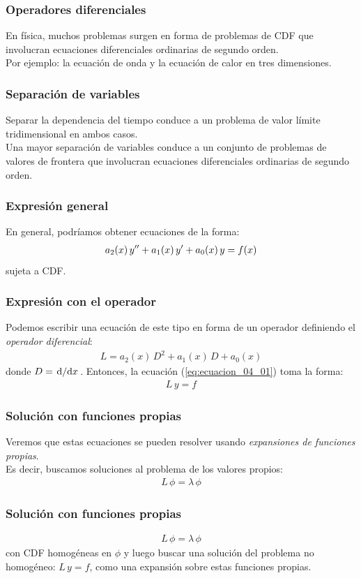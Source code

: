 \documentclass[12pt]{beamer}
\begin{document}
\begin{frame}
\frametitle{Operadores diferenciales}
En física, muchos problemas surgen en forma de problemas de CDF que involucran ecuaciones diferenciales ordinarias de segundo orden.
\\
\bigskip
\pause
Por ejemplo: la ecuación de onda y la ecuación de calor en tres dimensiones.
\end{frame}
\begin{frame}
\frametitle{Separación de variables}
Separar la dependencia del tiempo conduce a un problema de valor límite tridimensional en ambos casos.
\\
\bigskip
\pause
Una mayor separación de variables conduce a un conjunto de problemas de valores de frontera que involucran ecuaciones diferenciales ordinarias de segundo orden.
\end{frame}
\begin{frame}
\frametitle{Expresión general}
En general, podríamos obtener ecuaciones de la forma:
\pause
\begin{align}
a_{2} (x) \, {y}^{\prime \prime} + a_{1} (x) \, {y}^{\prime} + a_{0} (x) \, y = f(x)
\label{eq:ecuacion_04_01}
\end{align}
sujeta a CDF.
\end{frame}
\begin{frame}
\frametitle{Expresión con el operador}
Podemos escribir una ecuación de este tipo en forma de un operador definiendo el \emph{operador diferencial}:
\pause
\begin{align*}
L = a_{2} (x) \, D^{2} + a_{1} (x) \, D + a_{0} (x)
\end{align*}
donde $D = \dv*{x}$. \pause Entonces, la ecuación (\ref{eq:ecuacion_04_01}) toma la forma:
\begin{align*}
L \, y = f
\end{align*}
\end{frame}
\begin{frame}
\frametitle{Solución con funciones propias}
Veremos que estas ecuaciones se pueden resolver usando \emph{expansiones de funciones propias}.
\\
\bigskip
\pause
Es decir, buscamos soluciones al problema de los valores propios:
\pause
\begin{align*}
L \, \phi = \lambda \, \phi
\end{align*}
\end{frame}
\begin{frame}
\frametitle{Solución con funciones propias}
\begin{align*}
L \, \phi = \lambda \, \phi
\end{align*}        
con CDF homogéneas en $\phi$ y luego buscar una solución del problema no homogéneo: $L \, y = f$, como una expansión sobre estas funciones propias.
\end{frame}
\end{document}
